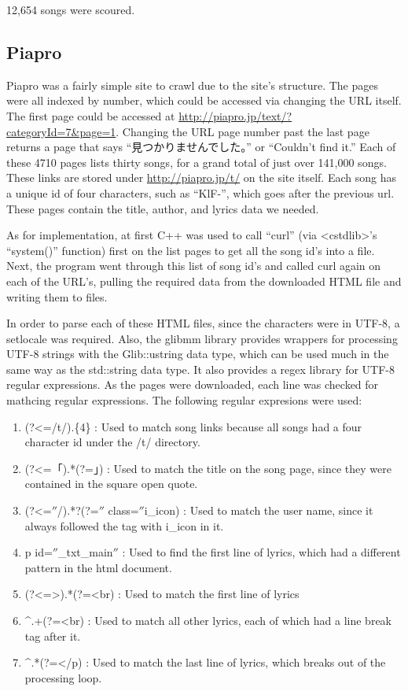 \documentclass{acm} %
\begin{document}
\begin{CJK}{UTF8}{zhsong}
12,654 songs were scoured.

\subsection{Piapro}

Piapro was a fairly simple site to crawl due to the site's structure. The pages were all indexed by number, which could be accessed via changing the URL itself. The first page could be accessed at \url{http://piapro.jp/text/?categoryId=7\&page=1}. Changing the URL page number past the last page returns a page that says ``見つかりませんでした。'' or ``Couldn't find it.'' Each of these 4710 pages lists thirty songs, for a grand total of just over 141,000 songs. These links are stored under \url{http://piapro.jp/t/} on the site itself. Each song has a unique id of four characters, such as ``KlF-'', which goes after the previous url. These pages contain the title, author, and lyrics data we needed.

As for implementation, at first C++ was used to call ``curl'' (via <cstdlib>'s ``system()'' function) first on the list pages to get all the song id's into a file. Next, the program went through this list of song id's and called curl again on each of the URL's, pulling the required data from the downloaded HTML file and writing them to files.

In order to parse each of these HTML files, since the characters were in UTF-8, a setlocale was required. Also, the glibmm library provides wrappers for processing UTF-8 strings with the Glib::ustring data type, which can be used much in the same way as the std::string data type. It also provides a regex library for UTF-8 regular expressions. As the pages were downloaded, each line was checked for mathcing regular expressions. The following regular expresions were used:

\begin{enumerate}
 \item (?<=/t/).\{4\} : Used to match song links because all songs had a four character id under the /t/ directory.
 \item (?<=「).*(?=」) : Used to match the title on the song page, since they were contained in the square open quote.
 \item (?<=$''$/).*?(?=$''$ class=$''$i\_icon) : Used to match the user name, since it always followed the tag with i\_icon in it.
 \item p id=$''$\_txt\_main$''$ : Used to find the first line of lyrics, which had a different pattern in the html document.
 \item (?<=>).*(?=<br) : Used to match the first line of lyrics
 \item \^{}.+(?=<br) : Used to match all other lyrics, each of which had a line break tag after it.
 \item \^{}.*(?=</p) : Used to match the last line of lyrics, which breaks out of the processing loop.
\end{enumerate}


\end{CJK}
\end{document}
